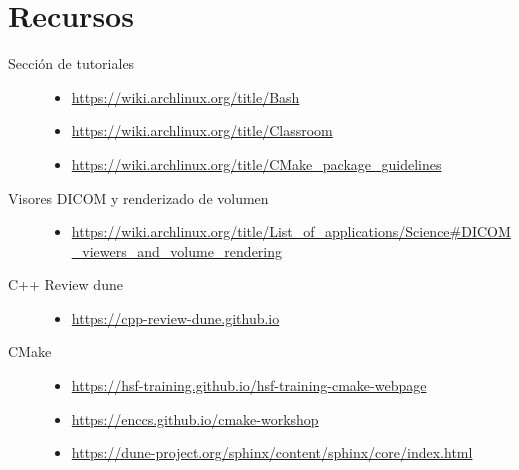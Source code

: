 \documentclass[9pt,a3paper]{scrartcl}
\begin{document}
\section*{\Huge Recursos}

\begin{description}
	\item[Sección de tutoriales]
		\leavevmode

		\begin{itemize}
			\item

			      \url{https://wiki.archlinux.org/title/Bash}

			\item

			      \url{https://wiki.archlinux.org/title/Classroom}

			\item

			      \url{https://wiki.archlinux.org/title/CMake_package_guidelines}
		\end{itemize}


	\item[Visores DICOM y renderizado de volumen]
		\leavevmode
		\begin{itemize}
			\item

			      \url{https://wiki.archlinux.org/title/List_of_applications/Science#DICOM_viewers_and_volume_rendering}
		\end{itemize}

	\item[C++ Review dune]
		\leavevmode
		\begin{itemize}
			\item

			      \url{https://cpp-review-dune.github.io}
		\end{itemize}

	\item[CMake]
		\leavevmode
		\begin{itemize}
			\item

			      \url{https://hsf-training.github.io/hsf-training-cmake-webpage}

			\item

			      \url{https://enccs.github.io/cmake-workshop}

			\item

			      \url{https://dune-project.org/sphinx/content/sphinx/core/index.html}
		\end{itemize}


\end{description}
\end{document}
